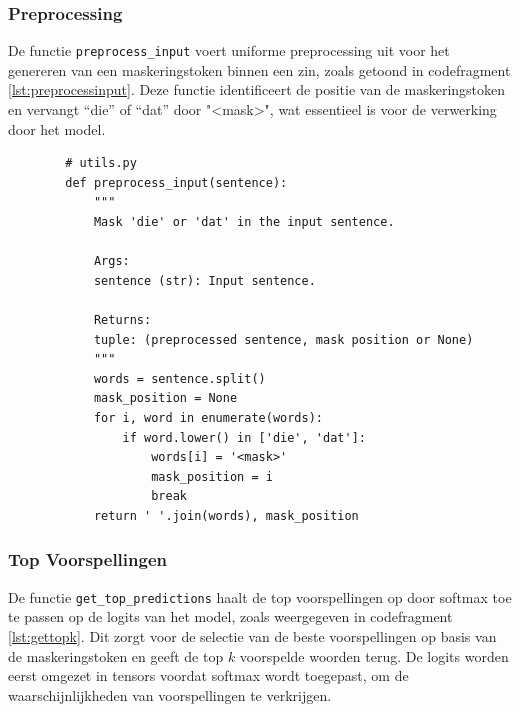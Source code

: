 \subsubsection{Preprocessing}
De functie \texttt{preprocess\_input} voert uniforme preprocessing uit voor het genereren van een maskeringstoken binnen een zin, zoals getoond in codefragment \ref{lst:preprocessinput}. Deze functie identificeert de positie van de maskeringstoken en vervangt ``die'' of ``dat'' door "<mask>", wat essentieel is voor de verwerking door het model.

\begin{listing}
    \begin{verbatim}
        # utils.py
        def preprocess_input(sentence):
            """
            Mask 'die' or 'dat' in the input sentence.
            
            Args:
            sentence (str): Input sentence.
            
            Returns:
            tuple: (preprocessed sentence, mask position or None)
            """
            words = sentence.split()
            mask_position = None
            for i, word in enumerate(words):
                if word.lower() in ['die', 'dat']:
                    words[i] = '<mask>'
                    mask_position = i
                    break
            return ' '.join(words), mask_position
    \end{verbatim}
    \caption[\texttt{preprocess\_input}]{\texttt{preprocess\_input}: Deze functie voert preprocessing uit op de invoerzinnen door ``die'' of ``dat'' te vervangen met "<mask>". Het retourneert zowel de bewerkte zin als de positie van de maskeringstoken.}
    \label{lst:preprocessinput}
\end{listing}

\subsubsection{Top Voorspellingen}
De functie \texttt{get\_top\_predictions} haalt de top voorspellingen op door \gls{softmax} toe te passen op de \glspl{logit} van het model, zoals weergegeven in codefragment \ref{lst:gettopk}. Dit zorgt voor de selectie van de beste voorspellingen op basis van de maskeringstoken en geeft de top \(k\) voorspelde woorden terug. De \glspl{logit} worden eerst omgezet in \glspl{tensor} voordat \gls{softmax} wordt toegepast, om de waarschijnlijkheden van voorspellingen te verkrijgen.

